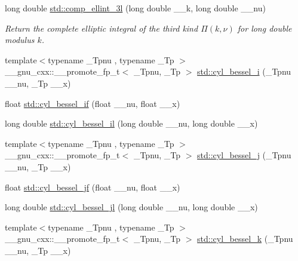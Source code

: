 \begin{DoxyCompactItemize}
long double \hyperlink{group__tr29124__math__spec__func_ga1ca081fee102cd0d4d6b091285e495e5}{std\+::comp\+\_\+ellint\+\_\+3l} (long double \+\_\+\+\_\+k, long double \+\_\+\+\_\+nu)
\begin{DoxyCompactList}\small\item\em Return the complete elliptic integral of the third kind $ \Pi(k,\nu) $ for {\ttfamily long double} modulus $ k $. \end{DoxyCompactList}\item 
{\footnotesize template$<$typename \+\_\+\+Tpnu , typename \+\_\+\+Tp $>$ }\\\+\_\+\+\_\+gnu\+\_\+cxx\+::\+\_\+\+\_\+promote\+\_\+fp\+\_\+t$<$ \+\_\+\+Tpnu, \+\_\+\+Tp $>$ \hyperlink{group__tr29124__math__spec__func_gac2ce366244694be909cd13bf8e1b439c}{std\+::cyl\+\_\+bessel\+\_\+i} (\+\_\+\+Tpnu \+\_\+\+\_\+nu, \+\_\+\+Tp \+\_\+\+\_\+x)
\item 
float \hyperlink{group__tr29124__math__spec__func_gaaf738427d4da0bda66bc2274dfb853a7}{std\+::cyl\+\_\+bessel\+\_\+if} (float \+\_\+\+\_\+nu, float \+\_\+\+\_\+x)
\item 
long double \hyperlink{group__tr29124__math__spec__func_gab7962629216d03efb8ecaa3f70c6878f}{std\+::cyl\+\_\+bessel\+\_\+il} (long double \+\_\+\+\_\+nu, long double \+\_\+\+\_\+x)
\item 
{\footnotesize template$<$typename \+\_\+\+Tpnu , typename \+\_\+\+Tp $>$ }\\\+\_\+\+\_\+gnu\+\_\+cxx\+::\+\_\+\+\_\+promote\+\_\+fp\+\_\+t$<$ \+\_\+\+Tpnu, \+\_\+\+Tp $>$ \hyperlink{group__tr29124__math__spec__func_ga968904e6095c70b275858f8e684403fb}{std\+::cyl\+\_\+bessel\+\_\+j} (\+\_\+\+Tpnu \+\_\+\+\_\+nu, \+\_\+\+Tp \+\_\+\+\_\+x)
\item 
float \hyperlink{group__tr29124__math__spec__func_ga15731a7bccd6351d28353e3c4c2a2d23}{std\+::cyl\+\_\+bessel\+\_\+jf} (float \+\_\+\+\_\+nu, float \+\_\+\+\_\+x)
\item 
long double \hyperlink{group__tr29124__math__spec__func_gade8e94a80520a8b628b2d658755b25c0}{std\+::cyl\+\_\+bessel\+\_\+jl} (long double \+\_\+\+\_\+nu, long double \+\_\+\+\_\+x)
\item 
{\footnotesize template$<$typename \+\_\+\+Tpnu , typename \+\_\+\+Tp $>$ }\\\+\_\+\+\_\+gnu\+\_\+cxx\+::\+\_\+\+\_\+promote\+\_\+fp\+\_\+t$<$ \+\_\+\+Tpnu, \+\_\+\+Tp $>$ \hyperlink{group__tr29124__math__spec__func_ga3cd72edf8e8ef6f225d9c4a067f9423e}{std\+::cyl\+\_\+bessel\+\_\+k} (\+\_\+\+Tpnu \+\_\+\+\_\+nu, \+\_\+\+Tp \+\_\+\+\_\+x)

\end{DoxyCompactItemize}

